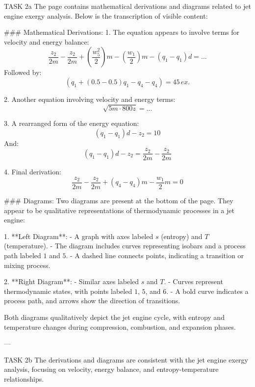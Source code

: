 TASK 2a  
The page contains mathematical derivations and diagrams related to jet engine exergy analysis. Below is the transcription of visible content:

### Mathematical Derivations:
1. The equation appears to involve terms for velocity and energy balance:
   \[
   \frac{z_2}{2m} - \frac{z_2}{2m} + \left( \frac{w_5^2}{2} \right) m - \left( \frac{w_1}{2} \right) m - (q_1 - q_1) d = \ldots
   \]
   Followed by:
   \[
   (q_1 + (0.5 - 0.5) q_1 - q_4 - q_4) = 45 \, ex.
   \]

2. Another equation involving velocity and energy terms:
   \[
   \sqrt{5m \cdot 800z} = \ldots
   \]

3. A rearranged form of the energy equation:
   \[
   (q_1 - q_1) d - z_2 = 10
   \]
   And:
   \[
   (q_1 - q_1) d - z_2 = \frac{z_2}{2m} - \frac{z_2}{2m}
   \]

4. Final derivation:
   \[
   \frac{z_2}{2m} - \frac{z_2}{2m} + (q_4 - q_4) m - \frac{w_1}{2} m = 0
   \]

### Diagrams:
Two diagrams are present at the bottom of the page. They appear to be qualitative representations of thermodynamic processes in a jet engine:

1. **Left Diagram**:  
   - A graph with axes labeled \( s \) (entropy) and \( T \) (temperature).  
   - The diagram includes curves representing isobars and a process path labeled \( 1 \) and \( 5 \).  
   - A dashed line connects points, indicating a transition or mixing process.  

2. **Right Diagram**:  
   - Similar axes labeled \( s \) and \( T \).  
   - Curves represent thermodynamic states, with points labeled \( 1 \), \( 5 \), and \( 6 \).  
   - A bold curve indicates a process path, and arrows show the direction of transitions.  

Both diagrams qualitatively depict the jet engine cycle, with entropy and temperature changes during compression, combustion, and expansion phases.

---

TASK 2b  
The derivations and diagrams are consistent with the jet engine exergy analysis, focusing on velocity, energy balance, and entropy-temperature relationships.